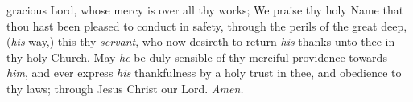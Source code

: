  gracious Lord, whose mercy is over all thy works; We praise thy holy Name that thou hast been pleased to conduct in safety, through the perils of the great deep, (\textit{his} way,) this thy \textit{servant}, who now desireth to return \textit{his} thanks unto thee in thy holy Church. May \textit{he} be duly sensible of thy merciful providence towards \textit{him}, and ever express \textit{his} thankfulness by a holy trust in thee, and obedience to thy laws; through Jesus Christ our Lord. \textit{Amen.}
